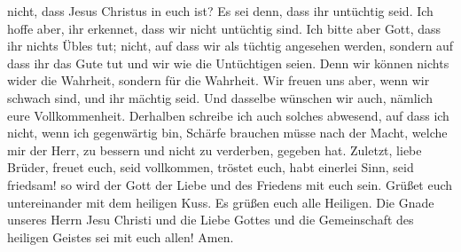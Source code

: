 nicht, dass Jesus Christus in euch ist? Es sei denn, dass ihr untüchtig
seid.  Ich hoffe aber, ihr erkennet, dass wir nicht
untüchtig sind.  Ich bitte aber Gott, dass ihr nichts Übles
tut; nicht, auf dass wir als tüchtig angesehen werden, sondern auf dass
ihr das Gute tut und wir wie die Untüchtigen seien.  Denn
wir können nichts wider die Wahrheit, sondern für die Wahrheit.
 Wir freuen uns aber, wenn wir schwach sind, und ihr mächtig
seid. Und dasselbe wünschen wir auch, nämlich eure Vollkommenheit.
 Derhalben schreibe ich auch solches abwesend, auf dass ich
nicht, wenn ich gegenwärtig bin, Schärfe brauchen müsse nach der Macht,
welche mir der Herr, zu bessern und nicht zu verderben, gegeben hat.
 Zuletzt, liebe Brüder, freuet euch, seid vollkommen,
tröstet euch, habt einerlei Sinn, seid friedsam! so wird der Gott der
Liebe und des Friedens mit euch sein.  Grüßet euch
untereinander mit dem heiligen Kuss. Es grüßen euch alle Heiligen.
 Die Gnade unseres Herrn Jesu Christi und die Liebe Gottes
und die Gemeinschaft des heiligen Geistes sei mit euch allen! Amen.
